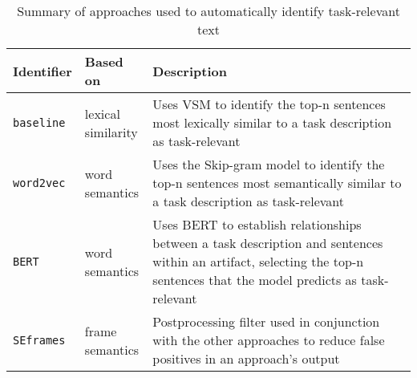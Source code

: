 
\begin{table}[H]
\centering    
\begin{scriptsize}
\begin{threeparttable}
\begin{tabular}{lll}





\textbf{Identifier} & \textbf{Based on} & \textbf{Description} \\

\hline


\texttt{baseline} & 
\parbox[l][1cm][c] {1.5cm}{lexical\\similarity} &
\parbox[l][1cm][c] {8.5cm}{
    Uses VSM to identify the top-n sentences most lexically similar to a task description as task-relevant
}
\\


\texttt{word2vec} & 
\parbox[l][1cm][c] {1.5cm}{word\\semantics} &
\parbox[l][1cm][c] {8.5cm}{
    Uses the Skip-gram model to identify the top-n sentences most semantically similar to a task description as task-relevant
}
\\

\texttt{BERT} & 
\parbox[l][1cm][c] {1.5cm}{word\\semantics} &
\parbox[l][1.4cm][c] {8.5cm}{
    Uses BERT to establish relationships between a task description and sentences within an artifact, selecting the top-n sentences 
    that the model predicts as task-relevant
}
\\


\texttt{SEframes} & 
\parbox[l][1cm][c] {1.5cm}{frame\\semantics} &
\parbox[l][1cm][c] {8.5cm}{
    Postprocessing filter used in conjunction with the other approaches to reduce false positives in an approach's output
}
\\

\hline


\end{tabular}
\end{threeparttable}
\end{scriptsize}
\caption{Summary of approaches used to automatically identify task-relevant text}
\label{tbl:approaches-summary}
\end{table}

